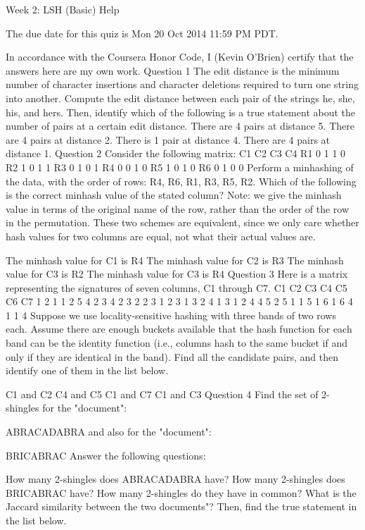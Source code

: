 
Week 2: LSH (Basic) Help

The due date for this quiz is Mon 20 Oct 2014 11:59 PM PDT.

In accordance with the Coursera Honor Code, I (Kevin O'Brien) certify that the answers here are my own work.
Question 1
The edit distance is the minimum number of character insertions and character deletions required to turn one string into another. Compute the edit distance between each pair of the strings he, she, his, and hers. Then, identify which of the following is a true statement about the number of pairs at a certain edit distance.
There are 4 pairs at distance 5.
There are 4 pairs at distance 2.
There is 1 pair at distance 4.
There are 4 pairs at distance 1.
Question 2
Consider the following matrix:
C1	C2	C3	C4
R1	0	1	1	0
R2	1	0	1	1
R3	0	1	0	1
R4	0	0	1	0
R5	1	0	1	0
R6	0	1	0	0
Perform a minhashing of the data, with the order of rows: R4, R6, R1, R3, R5, R2. Which of the following is the correct minhash value of the stated column? Note: we give the minhash value in terms of the original name of the row, rather than the order of the row in the permutation. These two schemes are equivalent, since we only care whether hash values for two columns are equal, not what their actual values are.

The minhash value for C1 is R4
The minhash value for C2 is R3
The minhash value for C3 is R2
The minhash value for C3 is R4
Question 3
Here is a matrix representing the signatures of seven columns, C1 through C7.
C1	C2	C3	C4	C5	C6	C7
1	2	1	1	2	5	4
2	3	4	2	3	2	2
3	1	2	3	1	3	2
4	1	3	1	2	4	4
5	2	5	1	1	5	1
6	1	6	4	1	1	4
Suppose we use locality-sensitive hashing with three bands of two rows each. Assume there are enough buckets available that the hash function for each band can be the identity function (i.e., columns hash to the same bucket if and only if they are identical in the band). Find all the candidate pairs, and then identify one of them in the list below.

C1 and C2
C4 and C5
C1 and C7
C1 and C3
Question 4
Find the set of 2-shingles for the "document":

ABRACADABRA
and also for the "document":


BRICABRAC
Answer the following questions:

How many 2-shingles does ABRACADABRA have?
How many 2-shingles does BRICABRAC have?
How many 2-shingles do they have in common?
What is the Jaccard similarity between the two documents"?
Then, find the true statement in the list below.

